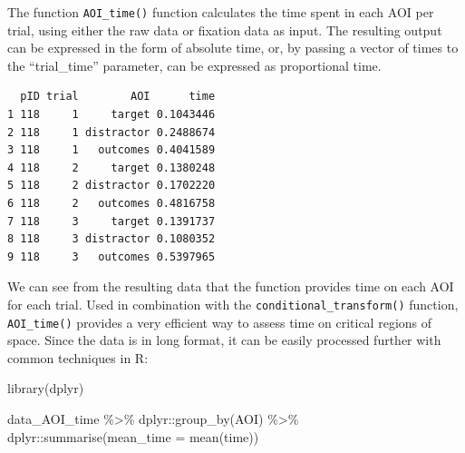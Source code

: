 \documentclass[
  man,
  floatsintext,
  longtable,
  nolmodern,
  notxfonts,
  notimes,
  colorlinks=true,linkcolor=blue,citecolor=blue,urlcolor=blue]{apa7}
\newenvironment{Shaded}{\begin{snugshade}}{\end{snugshade}}
\newcommand{\AttributeTok}[1]{\textcolor[rgb]{0.40,0.45,0.13}{#1}}
\newcommand{\ConstantTok}[1]{\textcolor[rgb]{0.56,0.35,0.01}{#1}}
\newcommand{\DecValTok}[1]{\textcolor[rgb]{0.68,0.00,0.00}{#1}}
\newcommand{\FunctionTok}[1]{\textcolor[rgb]{0.28,0.35,0.67}{#1}}
\newcommand{\NormalTok}[1]{\textcolor[rgb]{0.00,0.23,0.31}{#1}}
\newcommand{\OtherTok}[1]{\textcolor[rgb]{0.00,0.23,0.31}{#1}}
\newcommand{\SpecialCharTok}[1]{\textcolor[rgb]{0.37,0.37,0.37}{#1}}
\newcommand{\StringTok}[1]{\textcolor[rgb]{0.13,0.47,0.30}{#1}}
\begin{document}
The function \texttt{AOI\_time()} function calculates the time spent in
each AOI per trial, using either the raw data or fixation data as input.
The resulting output can be expressed in the form of absolute time, or,
by passing a vector of times to the ``trial\_time'' parameter, can be
expressed as proportional time.

\begin{Shaded}
\end{Shaded}

\begin{verbatim}
  pID trial        AOI      time
1 118     1     target 0.1043446
2 118     1 distractor 0.2488674
3 118     1   outcomes 0.4041589
4 118     2     target 0.1380248
5 118     2 distractor 0.1702220
6 118     2   outcomes 0.4816758
7 118     3     target 0.1391737
8 118     3 distractor 0.1080352
9 118     3   outcomes 0.5397965
\end{verbatim}

We can see from the resulting data that the function provides time on
each AOI for each trial. Used in combination with the
\texttt{conditional\_transform()} function, \texttt{AOI\_time()}
provides a very efficient way to assess time on critical regions of
space. Since the data is in long format, it can be easily processed
further with common techniques in R:

\begin{Shaded}
\begin{Highlighting}[]
\FunctionTok{library}\NormalTok{(dplyr)}

\NormalTok{data\_AOI\_time }\SpecialCharTok{\%\textgreater{}\%} 
\NormalTok{  dplyr}\SpecialCharTok{::}\FunctionTok{group\_by}\NormalTok{(AOI) }\SpecialCharTok{\%\textgreater{}\%} 
\NormalTok{  dplyr}\SpecialCharTok{::}\FunctionTok{summarise}\NormalTok{(}\AttributeTok{mean\_time =} \FunctionTok{mean}\NormalTok{(time))}
\end{Highlighting}
\end{Shaded}
\end{document}
